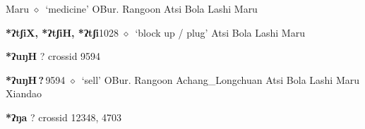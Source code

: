 \begin{list}{}{\leftmargin=1.5em \itemindent=-1.5em}
\hspace{1ex}
         Maru 
\hspace{1ex}
         $\diamond$~`medicine'
         OBur. 
\hspace{1ex}
         Rangoon 
\hspace{1ex}
         Atsi 
\hspace{1ex}
         Bola 
\hspace{1ex}
         Lashi 
\hspace{1ex}
         Maru 
  \item {\footnotesize \textbf{*ʔtʃiX, *ʔtʃiH, *ʔtʃi}}{\tiny 1028}
\hspace{1ex}
         $\diamond$~`block up / plug'
         Atsi 
\hspace{1ex}
         Bola 
\hspace{1ex}
         Lashi 
\hspace{1ex}
         Maru 
  \end{list}
\item
\textbf{*ʔuŋH}
?
  {\tiny crossid 9594}
  \begin{list}{}{\leftmargin=1.5em \itemindent=-1.5em}
  \item {\footnotesize \textbf{*ʔuŋH\,?\,}}{\tiny 9594}
         $\diamond$~`sell'
         OBur. 
\hspace{1ex}
         Rangoon 
\hspace{1ex}
         Achang\_Longchuan 
\hspace{1ex}
         Atsi 
\hspace{1ex}
         Bola 
\hspace{1ex}
         Lashi 
\hspace{1ex}
         Maru 
\hspace{1ex}
         Xiandao 
  \end{list}
\item
\textbf{*ʔŋa}
?
  {\tiny crossid 12348, 4703}
